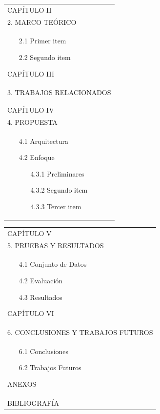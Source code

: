 \setlength{\tabcolsep}{3em} %
{\renewcommand{\arraystretch}{1.1}%
\begin{tabular}{p{17cm}}

CAPÍTULO II \\
2. MARCO TEÓRICO \\
\begin{enumerate}
	\item[2.1] Primer item
	\item[2.2] Segundo item
	
\end{enumerate}

CAPÍTULO III \\
3. TRABAJOS RELACIONADOS\\
\\
\\

CAPÍTULO IV \\
4. PROPUESTA \\
\begin{enumerate}
	\item[4.1] Arquitectura
	\item[4.2] Enfoque
	\begin{enumerate}
		\item[4.3.1] Preliminares
		\item[4.3.2] Segundo item
		\item[4.3.3] Tercer item
	\end{enumerate}
\end{enumerate}

\end{tabular}
}

\setlength{\tabcolsep}{3em} %
{\renewcommand{\arraystretch}{1.1}%
\begin{tabular}{p{17cm}}

CAPÍTULO V \\
5. PRUEBAS Y RESULTADOS \\
\begin{enumerate}
	\item[4.1] Conjunto de Datos
	\item[4.2] Evaluación
	\item[4.3] Resultados
	
\end{enumerate}
CAPÍTULO VI \\
6. CONCLUSIONES Y TRABAJOS FUTUROS \\
\begin{enumerate}
	\item[6.1] Conclusiones
	\item[6.2] Trabajos Futuros
\end{enumerate}

ANEXOS \\
BIBLIOGRAFÍA \\

\end{tabular}

}
